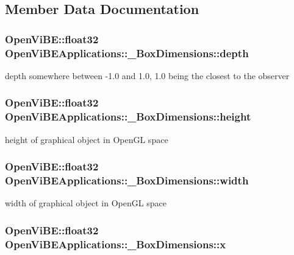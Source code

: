 \subsection{Member Data Documentation}
\hypertarget{structOpenViBEApplications_1_1__BoxDimensions_a4d510f0e7b4d39533b1c624c12cb5d88}{
\subsubsection[{depth}]{\setlength{\rightskip}{0pt plus 5cm}OpenViBE::float32 {\bf OpenViBEApplications::\_\-BoxDimensions::depth}}}
\label{structOpenViBEApplications_1_1__BoxDimensions_a4d510f0e7b4d39533b1c624c12cb5d88}
depth somewhere between -\/1.0 and 1.0, 1.0 being the closest to the observer \hypertarget{structOpenViBEApplications_1_1__BoxDimensions_acb657fdcc1fba5d062656062b2530587}{
\subsubsection[{height}]{\setlength{\rightskip}{0pt plus 5cm}OpenViBE::float32 {\bf OpenViBEApplications::\_\-BoxDimensions::height}}}
\label{structOpenViBEApplications_1_1__BoxDimensions_acb657fdcc1fba5d062656062b2530587}
height of graphical object in OpenGL space \hypertarget{structOpenViBEApplications_1_1__BoxDimensions_aaabc6843a3acc12d050c53741ec40519}{
\subsubsection[{width}]{\setlength{\rightskip}{0pt plus 5cm}OpenViBE::float32 {\bf OpenViBEApplications::\_\-BoxDimensions::width}}}
\label{structOpenViBEApplications_1_1__BoxDimensions_aaabc6843a3acc12d050c53741ec40519}
width of graphical object in OpenGL space \hypertarget{structOpenViBEApplications_1_1__BoxDimensions_a14cab78068cc81ed7119b6111c6af659}{
\subsubsection[{x}]{\setlength{\rightskip}{0pt plus 5cm}OpenViBE::float32 {\bf OpenViBEApplications::\_\-BoxDimensions::x}}}

